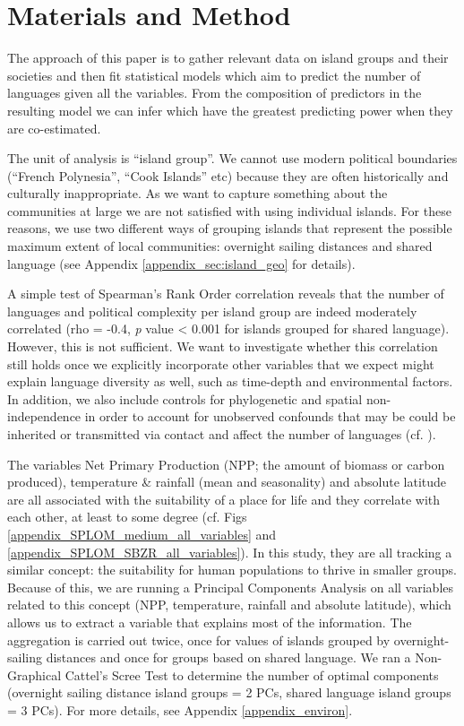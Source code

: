 \documentclass[unnumsec,webpdf,modern,medium]{oup-authoring-template}
\begin{document}
\section{Materials and Method}
\label{pol_complex_method}
The approach of this paper is to gather relevant data on island groups and their societies and then fit statistical models which aim to predict the number of languages given all the variables. From the composition of predictors in the resulting model we can infer which have the greatest predicting power when they are co-estimated.

The unit of analysis is ``island group''. We cannot use modern political boundaries (``French Polynesia'', ``Cook Islands'' etc) because they are often historically and culturally inappropriate. As we want to capture something about the communities at large we are not satisfied with using individual islands. For these reasons, we use two different ways of grouping islands that represent the possible maximum extent of local communities: overnight sailing distances and shared language (see Appendix \ref{appendix_sec:island_geo} for details).

A simple test of Spearman's Rank Order correlation reveals that the number of languages and political complexity per island group are indeed moderately correlated (rho  = -0.4, \emph{p} value < 0.001 for islands grouped for shared language). However, this is not sufficient. We want to investigate whether this correlation still holds once we explicitly incorporate other variables that we expect might explain language diversity as well, such as time-depth and environmental factors. In addition, we also include controls for phylogenetic and spatial non-independence in order to account for unobserved confounds that may be could be inherited or transmitted via contact and affect the number of languages (cf. \citet{gavin2013toward}).

The variables Net Primary Production (NPP; the amount of biomass or carbon produced), temperature \& rainfall (mean and seasonality) and absolute latitude are all associated with the suitability of a place for life and they correlate with each other, at least to some degree (cf. Figs \ref{appendix_SPLOM_medium_all_variables} and \ref{appendix_SPLOM_SBZR_all_variables}). In this study, they are all tracking a similar concept: the suitability for human populations to thrive in smaller groups. Because of this, we are running a Principal Components Analysis on all variables related to this concept (NPP, temperature, rainfall and absolute latitude), which allows us to extract a variable that explains most of the information. The aggregation is carried out twice, once for values of islands grouped by overnight-sailing distances and once for groups based on shared language. We ran a Non-Graphical Cattel's Scree Test \citep{cattell1966scree, R-nFactors} to determine the number of optimal components (overnight sailing distance island groups = 2 PCs, shared language island groups = 3 PCs). For more details, see Appendix \ref{appendix_environ}.
\end{document}
